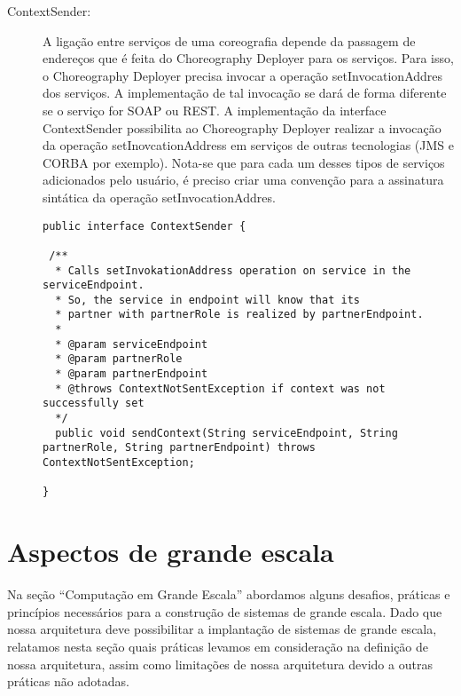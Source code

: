 \begin{description}
\item [ContextSender:]

A ligação entre serviços de uma coreografia depende da passagem de endereços que é feita do Choreography Deployer para os serviços. Para isso, o Choreography Deployer precisa invocar a operação setInvocationAddres dos serviços. A implementação de tal invocação se dará de forma diferente se o serviço for SOAP ou REST. A implementação da interface ContextSender possibilita ao Choreography Deployer realizar a invocação da operação setInovcationAddress em serviços de outras tecnologias (JMS e CORBA por exemplo). Nota-se que para cada um desses tipos de serviços adicionados pelo usuário, é preciso criar uma convenção para a assinatura sintática da operação setInvocationAddres.

\begin{lstlisting}[frame=trbl, label=lst:context_sender, caption=Interface ContextSender]
public interface ContextSender {
	
 /**
  * Calls setInvokationAddress operation on service in the serviceEndpoint.
  * So, the service in endpoint will know that its
  * partner with partnerRole is realized by partnerEndpoint.
  * 
  * @param serviceEndpoint
  * @param partnerRole
  * @param partnerEndpoint
  * @throws ContextNotSentException if context was not successfully set
  */
  public void sendContext(String serviceEndpoint, String partnerRole, String partnerEndpoint) throws ContextNotSentException;

}
\end{lstlisting}

\end{description}

\section{Aspectos de grande escala}
\label{sec:solucao_grande_escala}


Na seção ``Computação em Grande Escala'' abordamos alguns desafios, práticas e princípios necessários para a construção de sistemas de grande escala. Dado que nossa arquitetura deve possibilitar a implantação de sistemas de grande escala, relatamos nesta seção quais práticas levamos em consideração na definição de nossa arquitetura, assim como limitações de nossa arquitetura devido a outras práticas não adotadas.

